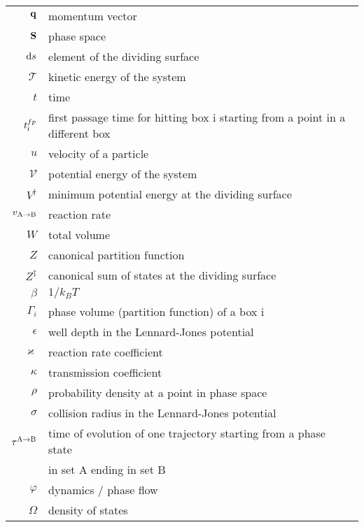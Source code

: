 \begin{longtable}{r >{\rule{0pt}{3ex}}l<{\rule[-1.5ex]{0pt}{0pt}}}
$\bf q$\rm & momentum vector \\
${\bf S}$ & phase space \\
${\rm d} s$ & element of the dividing surface \\
$\mathscr{T}$ & kinetic energy of the system \\
$t$ & time \\
$t^{fp}_{\rm i}$ & first passage time for hitting box i starting from a point in a different box\\
$u$ & velocity of a particle \\
$\mathscr{V}$ & potential energy of the system \\
$V^{\dagger}$ & minimum potential energy at the dividing surface \\
$v_{\rm A \rightarrow B}$ & reaction rate \\
$W$ & total volume \\
$Z$ & canonical partition function \\
$Z^{\ddagger}$ & canonical sum of states at the dividing surface \\
$\beta$ & $1/k_B T$ \\
$\Gamma_i$ & phase volume (partition function) of a box i \\
$\epsilon$ & well depth in the Lennard-Jones potential \\
$\varkappa$ & reaction rate coefficient \\
$\kappa$ & transmission coefficient \\
$\rho$ & probability density at a point in phase space \\
$\sigma$ & collision radius in the Lennard-Jones potential \\
$\tau^{\rm A \rightarrow B}$ & time of evolution of one trajectory starting from a phase state\\
& in set A ending in set B\\
$\varphi$ & dynamics / phase flow \\
$\Omega$ & density of states\\ %
\end{longtable}


